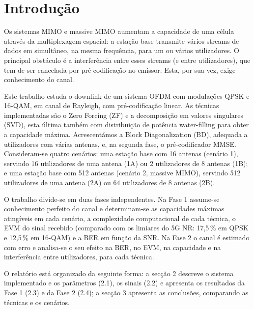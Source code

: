 \section{Introdução}
\label{sec:introducao}

Os sistemas MIMO e massive MIMO aumentam a capacidade de uma célula através da multiplexagem espacial: a estação base transmite vários streams de dados em simultâneo, na mesma frequência, para um ou vários utilizadores. O principal obstáculo é a interferência entre esses streams (e entre utilizadores), que tem de ser cancelada por pré-codificação no emissor. Esta, por sua vez, exige conhecimento do canal.

Este trabalho estuda o downlink de um sistema OFDM com modulações QPSK e 16-QAM, em canal de Rayleigh, com pré-codificação linear. As técnicas implementadas são o Zero Forcing (ZF) e a decomposição em valores singulares (SVD), esta última também com distribuição de potência water-filling para obter a capacidade máxima. Acrescentámos a Block Diagonalization (BD), adequada a utilizadores com várias antenas, e, na segunda fase, o pré-codificador MMSE. Consideram-se quatro cenários: uma estação base com 16 antenas (cenário 1), servindo 16 utilizadores de uma antena (1A) ou 2 utilizadores de 8 antenas (1B); e uma estação base com 512 antenas (cenário 2, massive MIMO), servindo 512 utilizadores de uma antena (2A) ou 64 utilizadores de 8 antenas (2B).

O trabalho divide-se em duas fases independentes. Na Fase 1 assume-se conhecimento perfeito do canal e determinam-se as capacidades máximas atingíveis em cada cenário, a complexidade computacional de cada técnica, o EVM do sinal recebido (comparado com os limiares do 5G NR: 17,5\,\% em QPSK e 12,5\,\% em 16-QAM) e a BER em função da SNR. Na Fase 2 o canal é estimado com erro e analisa-se o seu efeito na BER, no EVM, na capacidade e na interferência entre utilizadores, para cada técnica.

O relatório está organizado da seguinte forma: a secção 2 descreve o sistema implementado e os parâmetros (2.1), os sinais (2.2) e apresenta os resultados da Fase 1 (2.3) e da Fase 2 (2.4); a secção 3 apresenta as conclusões, comparando as técnicas e os cenários.